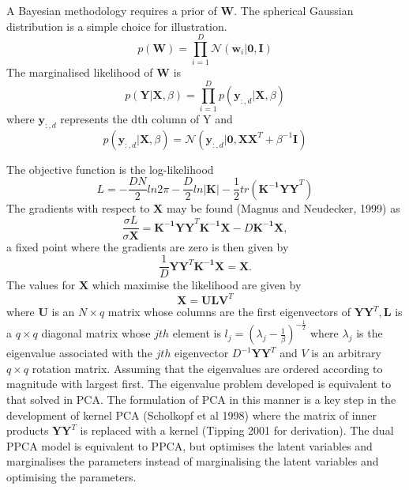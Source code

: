 \documentclass[ %
                    author={Dillon Keith Diep},
                supervisor={Dr. Carl Henrik Ek},
                    degree={MEng},
                     title={Assisted Content Generation for 3D Hair Geometry},
                  subtitle={[INCOMPLETE DRAFT, CONTAINS NOTES FROM RESEARCH]},
                      type={Research},
                      year={2014} ]{dissertation}
\begin{document}
A Bayesian methodology requires a prior of $\mathbf{W}$. The spherical Gaussian distribution is a simple choice for illustration.
\begin{equation}
	p(\mathbf{W})=\prod^D_{i=1}\mathcal{N}(\mathbf{w}_i|\mathbf{0,I})
\end{equation}
The marginalised likelihood of $\mathbf{W}$ is
\begin{equation}
	p(\mathbf{Y|X},\beta)=\prod^D_{i=1}p(\mathbf{y}_{:,d}|\mathbf{X},\beta)
\end{equation}
where $\mathbf{y}_{:,d}$ represents the dth column of Y and
\begin{equation}
	p(\mathbf{y}_{:,d}|\mathbf{X},\beta)=\mathcal{N}(\mathbf{y}_{:,d}|\mathbf{0,XX}^T+\beta^{-1}\mathbf{I})
\end{equation}

The objective function is the log-likelihood
\begin{equation}
	L=-\frac{DN}{2}ln2\pi-\frac{D}{2}ln|\mathbf{K}|-\frac{1}{2}tr(\mathbf{K^{-1}YY}^T)
\end{equation}
The gradients with respect to $\mathbf{X}$ may be found (Magnus and Neudecker, 1999) as
\begin{equation}
	\frac{\sigma L}{\sigma \mathbf{X}}=\mathbf{K^{-1}YY}^T\mathbf{K^{-1}X}-D\mathbf{K^{-1}X},
\end{equation}
a fixed point where the gradients are zero is then given by 
\begin{equation}
	\frac{1}{D}\mathbf{YY}^T\mathbf{K^{-1}X=X}.
\end{equation}
The values for $\mathbf{X}$ which maximise the likelihood are given by 
\begin{equation}
	\mathbf{X=ULV}^T
\end{equation}
where $\mathbf{U}$ is an $N\times q$ matrix whose columns are the first eigenvectors of $\mathbf{YY}^T,\mathbf{L}$ is a $q\times q$ diagonal matrix whose $jth$ element is $l_j=(\lambda_j-\frac{1}{\beta})^{-\frac{1}{2}}$ where $\lambda_j$ is the eigenvalue associated with the $jth$ eigenvector $D^{-1}\mathbf{YY}^T$ and $V$ is an arbitrary $q\times q$ rotation matrix. Assuming that the eigenvalues are ordered according to magnitude with largest first. The eigenvalue problem developed is equivalent to that solved in PCA. %
The formulation of PCA in this manner is a key step in the development of kernel PCA (Scholkopf et al 1998) where the matrix of inner products $\mathbf{YY}^T$ is replaced with a kernel (Tipping 2001 for derivation). The dual PPCA model is equivalent to PPCA, but optimises the latent variables and marginalises the parameters instead of marginalising the latent variables and optimising the parameters.
\end{document}
